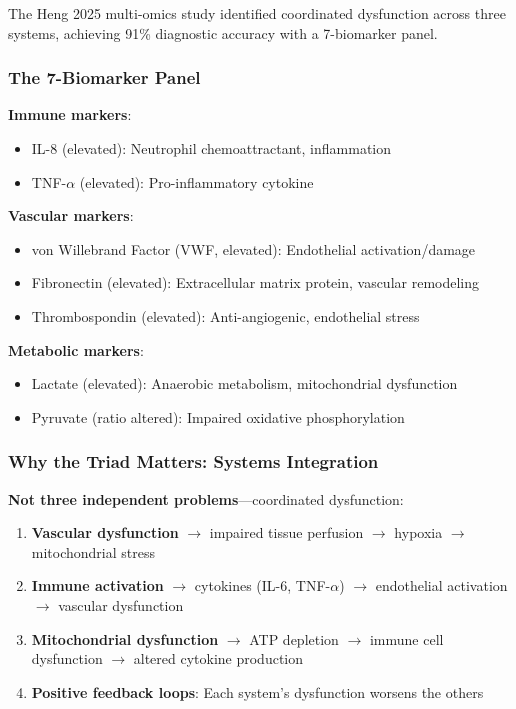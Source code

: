 The Heng 2025 multi-omics study identified coordinated dysfunction across three systems, achieving 91\% diagnostic accuracy with a 7-biomarker panel.

\subsubsection{The 7-Biomarker Panel}

\textbf{Immune markers}:
\begin{itemize}
    \item IL-8 (elevated): Neutrophil chemoattractant, inflammation
    \item TNF-$\alpha$ (elevated): Pro-inflammatory cytokine
\end{itemize}

\textbf{Vascular markers}:
\begin{itemize}
    \item von Willebrand Factor (VWF, elevated): Endothelial activation/damage
    \item Fibronectin (elevated): Extracellular matrix protein, vascular remodeling
    \item Thrombospondin (elevated): Anti-angiogenic, endothelial stress
\end{itemize}

\textbf{Metabolic markers}:
\begin{itemize}
    \item Lactate (elevated): Anaerobic metabolism, mitochondrial dysfunction
    \item Pyruvate (ratio altered): Impaired oxidative phosphorylation
\end{itemize}

\subsubsection{Why the Triad Matters: Systems Integration}

\textbf{Not three independent problems}---coordinated dysfunction:

\begin{enumerate}
    \item \textbf{Vascular dysfunction} $\rightarrow$ impaired tissue perfusion $\rightarrow$ hypoxia $\rightarrow$ mitochondrial stress
    \item \textbf{Immune activation} $\rightarrow$ cytokines (IL-6, TNF-$\alpha$) $\rightarrow$ endothelial activation $\rightarrow$ vascular dysfunction
    \item \textbf{Mitochondrial dysfunction} $\rightarrow$ ATP depletion $\rightarrow$ immune cell dysfunction $\rightarrow$ altered cytokine production
    \item \textbf{Positive feedback loops}: Each system's dysfunction worsens the others
\end{enumerate}

